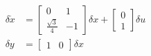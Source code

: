 \documentclass[a4paper, 11pt]{article}
\begin{document}
\begin{subequations}\label{eq:linearized_system}
	\begin{align}
		\delta \dot x & = \begin{bmatrix}
			0 & 1 \\ \frac{\sqrt{3}}{4} & -1
		\end{bmatrix} \delta x + \begin{bmatrix}
			0 \\ 1
		\end{bmatrix} \delta u \\
		\delta y & = \begin{bmatrix}
			1 & 0
		\end{bmatrix} \delta x
	\end{align}
\end{subequations}
\end{document}

